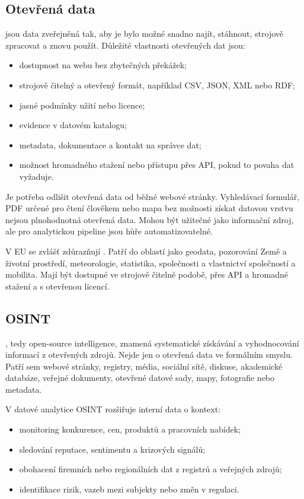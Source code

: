 \subsection{Otevřená data}
 jsou data zveřejněná tak, aby je bylo možné snadno najít, stáhnout, strojově
zpracovat a znovu použít. Důležité vlastnosti otevřených dat jsou:
\begin{itemize}
  \item dostupnost na webu bez zbytečných překážek;
  \item strojově čitelný a otevřený formát, například CSV, JSON, XML nebo RDF;
  \item jasné podmínky užití nebo licence;
  \item evidence v datovém katalogu;
  \item metadata, dokumentace a kontakt na správce dat;
  \item možnost hromadného stažení nebo přístupu přes API, pokud to povaha dat vyžaduje.
\end{itemize}

Je potřeba odlišit otevřená data od běžné webové stránky. Vyhledávací formulář, PDF určené pro čtení
člověkem nebo mapa bez možnosti získat datovou vrstvu nejsou plnohodnotná otevřená data. Mohou být
užitečné jako informační zdroj, ale pro analytickou pipeline jsou hůře automatizovatelné.

V EU se zvlášť zdůrazňují . Patří do oblastí jako geodata,
pozorování Země a životní prostředí, meteorologie, statistika, společnosti a vlastnictví společností
a mobilita. Mají být dostupné ve strojově čitelné podobě, přes API a hromadné stažení a s otevřenou
licencí.

\subsection{OSINT}
, tedy open-source intelligence, znamená systematické získávání a vyhodnocování informací
z otevřených zdrojů. Nejde jen o otevřená data ve formálním smyslu. Patří sem webové stránky, registry,
média, sociální sítě, diskuse, akademické databáze, veřejné dokumenty, otevřené datové sady, mapy,
fotografie nebo metadata.

V datové analytice OSINT rozšiřuje interní data o kontext:
\begin{itemize}
  \item monitoring konkurence, cen, produktů a pracovních nabídek;
  \item sledování reputace, sentimentu a krizových signálů;
  \item obohacení firemních nebo regionálních dat z registrů a veřejných zdrojů;
  \item identifikace rizik, vazeb mezi subjekty nebo změn v regulaci.
\end{itemize}

